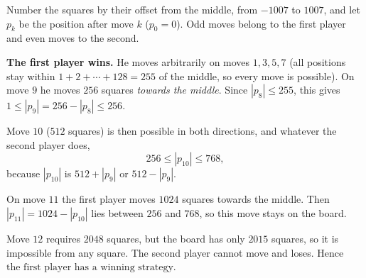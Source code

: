 Number the squares by their offset from the middle, from $-1007$ to $1007$, and let $p_k$ be the position after move $k$ ($p_0=0$). Odd moves belong to the first player and even moves to the second.

\textbf{The first player wins.} He moves arbitrarily on moves $1,3,5,7$ (all positions stay within $1+2+\cdots+128=255$ of the middle, so every move is possible). On move $9$ he moves $256$ squares \emph{towards the middle}. Since $|p_8|\le255$, this gives $1\le|p_9|=256-|p_8|\le256$.

Move $10$ ($512$ squares) is then possible in both directions, and whatever the second player does,
\[256\le|p_{10}|\le768,\]
because $|p_{10}|$ is $512+|p_9|$ or $512-|p_9|$.

On move $11$ the first player moves $1024$ squares towards the middle. Then $|p_{11}|=1024-|p_{10}|$ lies between $256$ and $768$, so this move stays on the board.

Move $12$ requires $2048$ squares, but the board has only $2015$ squares, so it is impossible from any square. The second player cannot move and loses. Hence $\boxed{\text{the first player has a winning strategy}}$.
